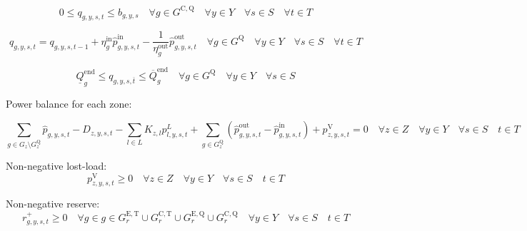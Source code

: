 \documentclass{article}
\newcommand{\sGenerators}{G}
\newcommand{\sGeneratorsExistingThermal}{G^{\mathrm{E,T}}}
\newcommand{\sGeneratorsCandidateThermal}{G^{\mathrm{C,T}}}
\newcommand{\sStorage}{G^{\mathrm{Q}}}
\newcommand{\sStorageExisting}{G^{\mathrm{E,Q}}}
\newcommand{\sStorageCandidate}{G^{\mathrm{C,Q}}}
\newcommand{\sYears}{Y}
\newcommand{\sScenarios}{S}
\newcommand{\sIntervals}{T}
\newcommand{\sZones}{Z}
\newcommand{\sLinks}{L}
\newcommand{\iGenerator}{g}
\newcommand{\iYear}{y}
\newcommand{\iScenario}{s}
\newcommand{\iInterval}{t}
\newcommand{\iIntervalTerminal}{\overline{\iInterval}}
\newcommand{\iZone}{z}
\newcommand{\iRegion}{r}
\newcommand{\iLink}{l}
\newcommand{\cStorageUnitEnergyIntervalEndMax}[1][\iGenerator]{\overline{Q}^{\mathrm{end}}_{#1}}
\newcommand{\cStorageUnitEnergyIntervalEndMin}[1][\iGenerator]{\underline{Q}^{\mathrm{end}}_{#1}}
\newcommand{\cStorageUnitEfficiencyCharging}{\eta_{\iGenerator}^{\mathrm{in}}}
\newcommand{\cStorageUnitEfficiencyDischarging}{\eta_{\iGenerator}^{\mathrm{out}}}
\newcommand{\cDemand}[1][\iZone,\iYear,\iScenario,\iInterval]{D_{#1}}
\newcommand{\cIncidenceMatrix}[1][\iZone,\iLink]{K_{#1}}
\newcommand{\vReserveUp}[1][\iGenerator,\iYear,\iScenario,\iInterval]{r^{+}_{#1}}
\newcommand{\vPowerTotal}[1][\iGenerator,\iYear,\iScenario,\iInterval]{\hat{p}_{#1}}
\newcommand{\vPowerTotalIn}[1][\iGenerator,\iYear,\iScenario,\iInterval]{\hat{p}^{\mathrm{in}}_{#1}}
\newcommand{\vPowerTotalOut}[1][\iGenerator,\iYear,\iScenario,\iInterval]{\hat{p}^{\mathrm{out}}_{#1}}
\newcommand{\vStorageUnitEnergy}[1][\iGenerator,\iYear,\iScenario,\iInterval]{q_{#1}}
\newcommand{\vPowerFlow}[1][\iLink,\iYear,\iScenario,\iInterval]{p^{\sLinks}_{#1}}
\newcommand{\vLostLoadPower}[1][\iZone,\iYear,\iScenario,\iInterval]{p^{\mathrm{V}}_{#1}}
\newcommand{\vInstalledCapacityTotalScenario}[1][\iGenerator,\iYear,\iScenario]{b_{#1}}
\begin{document}
\begin{equation}
0 \leq \vStorageUnitEnergy \leq \vInstalledCapacityTotalScenario \quad \forall \iGenerator \in \sStorageCandidate \quad \forall \iYear \in \sYears \quad \forall \iScenario \in \sScenarios \quad \forall \iInterval \in \sIntervals
\end{equation}

\begin{equation}
\vStorageUnitEnergy = \vStorageUnitEnergy[\iGenerator,\iYear,\iScenario,\iInterval-1] + \cStorageUnitEfficiencyCharging \vPowerTotalIn - \frac{1}{\cStorageUnitEfficiencyDischarging} \vPowerTotalOut \quad \forall \iGenerator \in \sStorage \quad \forall \iYear \in \sYears \quad \forall \iScenario \in \sScenarios \quad \forall \iInterval \in \sIntervals
\end{equation}


\begin{equation}
\cStorageUnitEnergyIntervalEndMin \leq \vStorageUnitEnergy[\iGenerator,\iYear,\iScenario,\iIntervalTerminal] \leq \cStorageUnitEnergyIntervalEndMax \quad \forall \iGenerator \in \sStorage \quad \forall \iYear \in \sYears \quad \forall \iScenario \in \sScenarios
\end{equation}

Power balance for each zone:

\begin{equation}
\sum\limits_{\iGenerator \in \sGenerators_{\iZone} \setminus \sStorage_{\iZone}} \vPowerTotal - \cDemand - \sum\limits_{\iLink \in \sLinks} \cIncidenceMatrix \vPowerFlow + \sum\limits_{\iGenerator \in \sStorage_{\iZone}} \left(\vPowerTotalOut - \vPowerTotalIn\right) + \vLostLoadPower = 0 \quad \forall \iZone \in \sZones \quad \forall \iYear \in \sYears \quad \forall \iScenario \in \sScenarios \quad \iInterval \in \sIntervals
\end{equation}

Non-negative lost-load:
\begin{equation}
\vLostLoadPower \geq 0 \quad \forall \iZone \in \sZones \quad \forall \iYear \in \sYears \quad \forall \iScenario \in \sScenarios \quad \iInterval \in \sIntervals
\end{equation}

Non-negative reserve:
\begin{equation}
\vReserveUp \geq 0 \quad \forall \iGenerator \in \iGenerator \in \sGeneratorsExistingThermal_{\iRegion} \cup \sGeneratorsCandidateThermal_{\iRegion} \cup \sStorageExisting_{\iRegion} \cup \sStorageCandidate_{\iRegion} \quad \forall \iYear \in \sYears \quad \forall \iScenario \in \sScenarios \quad \iInterval \in \sIntervals
\end{equation}
\end{document}
